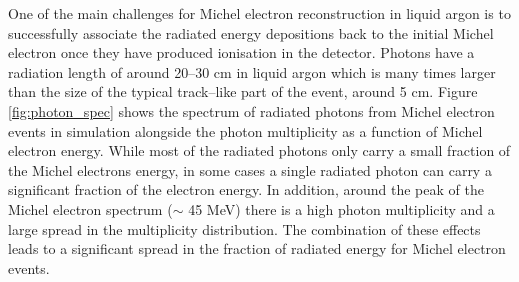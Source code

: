 One of the main challenges for Michel electron reconstruction in liquid argon is
to successfully associate the radiated energy depositions back to the initial
Michel electron once they have produced ionisation in the detector. Photons have
a radiation length of around 20--30 cm in liquid argon which is many times
larger than the size of the typical track--like part of the event, around 5 cm. 
Figure \ref{fig:photon_spec} shows the spectrum of radiated photons from Michel 
electron events in \protodune{} simulation alongside the photon multiplicity 
as a function of Michel electron energy. While most of the radiated photons 
only carry a small fraction of the Michel electrons energy, in some cases a 
single radiated photon can carry a significant fraction of the electron 
energy. In addition, around the peak of the Michel electron spectrum ($\sim$
45 MeV) there is a high photon multiplicity and a large spread in the
multiplicity distribution. The combination of these effects leads to a
significant spread in the fraction of radiated energy for Michel electron
events.

